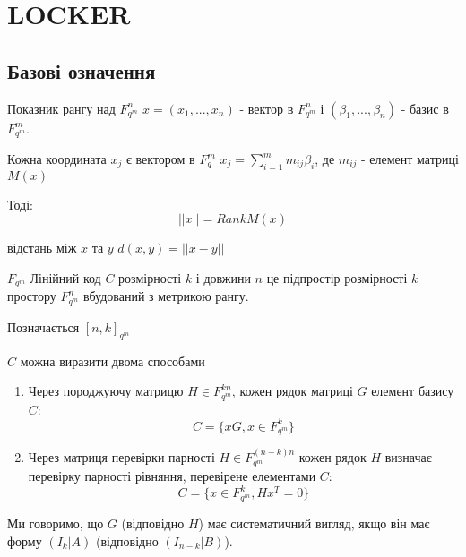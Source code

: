 
\chapter{LOCKER}
\label{chap:loker}  %

\section{Базові означення}

\begin{definition}
    Показник рангу над $F_{q^m}^n$ $x = (x_1, ..., x_n)$ - вектор в  $F_{q^m}^n$ і $(\beta_1, ..., \beta_n)$ - базис в $F_{q^m}^m$.
    
    Кожна координата $x_j$ є вектором в $F_{q}^m$ $x_j = \sum_{i=1}^m m_{ij}\beta_i$, де $m_{ij}$ - елемент матриці $M(x)$

    Тоді:
    \begin{equation}
        ||x|| = Rank M(x)
    \end{equation}

    відстань між $x$ та $y$ $d(x, y) = ||x-y||$
\end{definition}

\begin{definition}
    $F_{q^m}$ Лінійний код $C$ розмірності $k$ і довжини $n$ це підпростір розмірності $k$ простору $F_{q^m}^n$ вбудований з метрикою рангу. 

    Позначається $[n, k]_{q^m}$

    $C$ можна виразити двома способами

    \begin{enumerate}
        \item Через породжуючу матрицю $H \in F_{q^m}^{kn}$, кожен рядок матриці $G$ елемент базису $C$: 
        \begin{equation}
            C = \{xG, x \in F_{q^m}^k\}
        \end{equation}
        \item Через матриця перевірки парності $H \in F_{q^m}^{(n-k)n}$ кожен рядок $H$ визначає перевірку парності
        рівняння, перевірене елементами $C$:
        \begin{equation}
            C = \{x \in F_{q^m}^k, Hx^T = 0\}
        \end{equation}
    \end{enumerate}

    Ми говоримо, що $G$ (відповідно $H$) має систематичний вигляд, якщо він має форму $(I_k|A)$ (відповідно $(I_{n-k}|B)$).
\end{definition}

